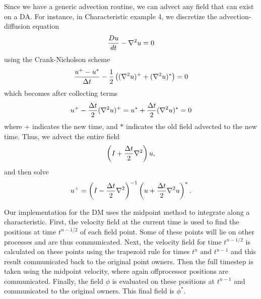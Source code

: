 \documentclass[twoside,12pt]{../sty/report_petsc}
\begin{document}
    Since we have a generic advection routine, we can advect any field that can exist on a DA. For instance, in
Characteristic example 4, we discretize the advection-diffusion equation
\begin{equation}
  {Du\over dt} - \nabla^2 u = 0
\end{equation}
using the Crank-Nicholson scheme
\begin{equation}
  {u^+ - u^* \over \Delta t} - {1\over2} \left( (\nabla^2 u)^+ + (\nabla^2 u)^* \right) = 0
\end{equation}
which becomes after collecting terms
\begin{equation}
  u^+ -  {\Delta t\over 2} (\nabla^2 u)^+ = u^* + {\Delta t\over 2} (\nabla^2 u)^* = 0
\end{equation}
where $+$ indicates the new time, and $*$ indicates the old field advected to the new time. Thus, we advect the entire
field
\begin{equation}
  \left( I + {\Delta t\over 2} \nabla^2 \right) u,
\end{equation}
and then solve
\begin{equation}
  u^+ = \left( I - {\Delta t\over 2} \nabla^2 \right)^{-1} \left( u + {\Delta t\over 2} \nabla^2 u \right)^*.
\end{equation}

Our implementation for the DM uses the midpoint method to integrate along a characteristic. First, the velocity field at
the current time is used to find the positions at time $t^{n-1/2}$ of each field point. Some of these points will lie on
other processes and are thus communicated. Next, the velocity field for time $t^{n-1/2}$ is calculated on these points
using the trapezoid rule for times $t^n$ and $t^{n-1}$ and this result communicated back to the original point
owners. Then the full timestep is taken using the midpoint velocity, where again offprocessor positions are
communicated. Finally, the field $\phi$ is evaluated on these positions at $t^{n-1}$ and communicated to the original
owners. This final field is $\phi^*$.




\end{document}

